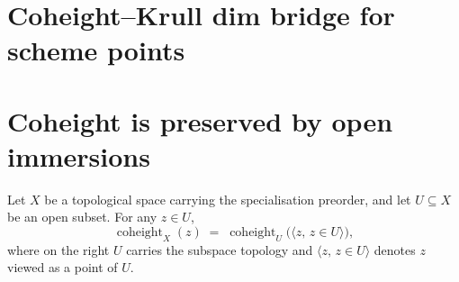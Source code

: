 
\section{Coheight--Krull dim bridge for scheme points}
\label{mk-chap:Albanese_CoheightBridge}

\section{Coheight is preserved by open immersions}
\label{mk-sec:coheight_topology}

\begin{lemma}\label{mk-lem:coheight_eq_of_isOpenEmbedding}
  \leanok

  Let \(X\) be a topological space carrying the specialisation preorder, and
  let \(U \subseteq X\) be an open subset. For any \(z \in U\),
  \[
    \operatorname{coheight}_{X}(z) \;=\; \operatorname{coheight}_{U}\bigl(\langle z, \, z \in U\rangle\bigr),
  \]
  where on the right \(U\) carries the subspace topology and \(\langle z, \,
  z \in U\rangle\) denotes \(z\) viewed as a point of \(U\).
\end{lemma}

